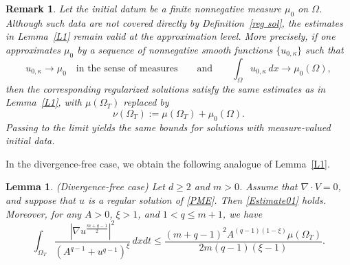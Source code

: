 \documentclass{amsart}
\newtheorem{lemma}[defn]{Lemma}
\newtheorem{remark}[defn]{Remark}
\numberwithin{equation}{section}
\begin{document}
\begin{remark}\label{L1 rmk}
Let the initial datum be a finite nonnegative measure $\mu_0$ on $\Omega$. Although such data are not covered directly by Definition~\ref{reg sol}, the estimates in Lemma~\ref{L1} remain valid at the approximation level. More precisely, if one approximates $\mu_0$ by a sequence of nonnegative smooth functions $\{u_{0,\kappa}\}$ such that
\[
u_{0,\kappa} \to \mu_0 \quad \text{in the sense of measures}
\qquad\text{and}\qquad
\int_\Omega u_{0,\kappa}\,dx \to \mu_0(\Omega),
\]
then the corresponding regularized solutions satisfy the same estimates as in Lemma~\ref{L1}, with $\mu(\Omega_T)$ replaced by
\[
\nu(\Omega_T):=\mu(\Omega_T)+\mu_0(\Omega).
\]
Passing to the limit yields the same bounds for solutions with measure-valued initial data.
\end{remark}




In the divergence-free case, we obtain the following analogue of Lemma~\ref{L1}.
\begin{lemma}\label{L:divfree:apriori}
(Divergence-free case)
Let $d\geq 2$ and $m>0$. Assume that $\nabla\cdot V=0$, and suppose that $u$ is a regular solution of \eqref{PME}. Then \eqref{Estimate01} holds. Moreover, for any $A>0$, $\xi>1$, and $1<q\le m+1$, we have
\begin{equation}\label{Estimate02:divfree}
\int_{\Omega_T}
\frac{\left|\nabla u^{\frac{m+q-1}{2}}\right|^2}
{\left(A^{q-1}+u^{q-1}\right)^\xi}
\,dxdt
\le
\frac{(m+q-1)^2A^{(q-1)(1-\xi)}\mu(\Omega_T)}
{2m(q-1)(\xi-1)}.
\end{equation}
\end{lemma}
\end{document}
